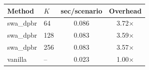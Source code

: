 \begin{tabular}{llcc}\toprule
Method & $K$ & sec/scenario & Overhead \\\midrule
swa_dpbr & 64 & 0.086 & 3.72$\times$ \\
swa_dpbr & 128 & 0.083 & 3.59$\times$ \\
swa_dpbr & 256 & 0.083 & 3.57$\times$ \\
vanilla & -- & 0.023 & 1.00$\times$ \\
\bottomrule
\end{tabular}